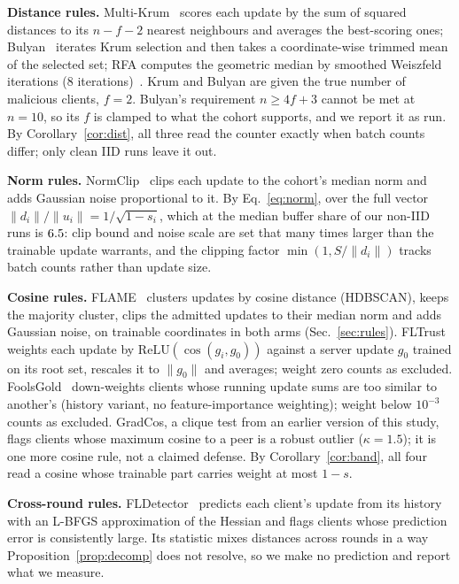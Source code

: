 \documentclass[journal]{IEEEtran}
\begin{document}
\textbf{Distance rules.} Multi-Krum~\cite{blanchard2017} scores each update by
the sum of squared distances to its $n-f-2$ nearest neighbours and averages the
best-scoring ones; Bulyan~\cite{mhamdi2018bulyan} iterates Krum selection and
then takes a coordinate-wise trimmed mean of the selected set; RFA computes the
geometric median by smoothed Weiszfeld iterations ($8$
iterations)~\cite{pillutla2022rfa}. Krum and Bulyan are given the true number of
malicious clients, $f=2$. Bulyan's requirement $n\ge 4f+3$ cannot be met at
$n=10$, so its $f$ is clamped to what the cohort supports, and we report it as
run. By Corollary~\ref{cor:dist}, all three read the counter exactly when batch
counts differ; only clean IID runs leave it out.

\textbf{Norm rules.} NormClip~\cite{sun2019} clips each update to the cohort's
median norm and adds Gaussian noise proportional to it. By Eq.~\eqref{eq:norm},
over the full vector $\|d_i\|/\|u_i\|=1/\sqrt{1-s_i}$, which at the median buffer
share of our non-IID runs is $6.5$: clip bound and noise scale are
set that many times larger than the trainable update warrants, and the clipping
factor $\min(1,S/\|d_i\|)$ tracks batch counts rather than update size.

\textbf{Cosine rules.} FLAME~\cite{nguyen2022flame} clusters updates by cosine distance
(HDBSCAN), keeps the majority cluster, clips the admitted updates to their median norm and
adds Gaussian noise, on trainable coordinates in both arms (Sec.~\ref{sec:rules}).
FLTrust~\cite{cao2021fltrust} weights each update by $\mathrm{ReLU}(\cos(g_i,g_0))$ against
a server update $g_0$ trained on its root set, rescales it to $\|g_0\|$ and averages; weight
zero counts as excluded. FoolsGold~\cite{fung2020foolsgold} down-weights clients whose
running update sums are too similar to another's (history variant, no feature-importance
weighting); weight below $10^{-3}$ counts as excluded. GradCos, a clique test from an
earlier version of this study, flags clients whose maximum cosine to a peer is a robust
outlier ($\kappa=1.5$); it is one more cosine rule, not a claimed defense. By
Corollary~\ref{cor:band}, all four read a cosine whose trainable part carries weight at
most $1-s$.

\textbf{Cross-round rules.} FLDetector~\cite{zhang2022fldetector} predicts each
client's update from its history with an L-BFGS approximation of the Hessian and
flags clients whose prediction error is consistently large. Its statistic mixes
distances across rounds in a way Proposition~\ref{prop:decomp} does not resolve,
so we make no prediction and report what we measure.
\end{document}
